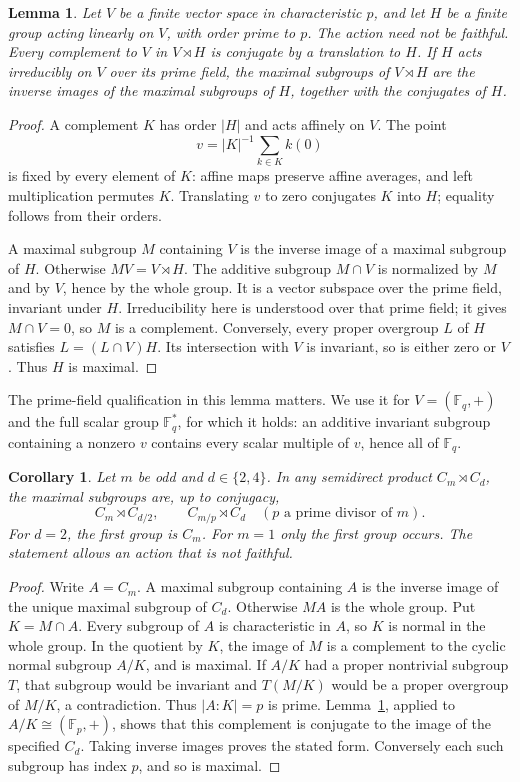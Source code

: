 \documentclass[11pt,a4paper]{article}
\newtheorem{lemma}[theorem]{Lemma}
\newtheorem{corollary}[theorem]{Corollary}
\newcommand{\F}{\mathbb F}
\begin{document}
\begin{lemma}\label{affine}
Let $V$ be a finite vector space in characteristic $p$, and let
$H$ be a finite group acting linearly on $V$, with order prime to $p$.
The action need not be faithful. Every complement
to $V$ in $V\rtimes H$ is conjugate by a translation to $H$.
If $H$ acts irreducibly on $V$ over its prime field, the maximal subgroups of $V\rtimes H$
are the inverse images of the maximal subgroups of $H$, together
with the conjugates of $H$.
\end{lemma}
\begin{proof}
A complement $K$ has order $|H|$ and acts affinely on $V$. The point
\[
                 v=|K|^{-1}\sum_{k\in K}k(0)
\]
is fixed by every element of $K$: affine maps preserve affine
averages, and left multiplication permutes $K$. Translating $v$ to
zero conjugates $K$ into $H$; equality follows from their orders.

A maximal subgroup $M$ containing $V$ is the inverse image of a
maximal subgroup of $H$. Otherwise $MV=V\rtimes H$. The additive
subgroup $M\cap V$ is normalized by $M$ and by $V$, hence by the
whole group. It is a vector subspace over the prime field, invariant
under $H$. Irreducibility here is understood over that prime field;
it gives $M\cap V=0$, so $M$ is a complement. Conversely, every
proper overgroup $L$ of $H$ satisfies
$L=(L\cap V)H$. Its intersection with $V$ is invariant, so is either
zero or $V$. Thus $H$ is maximal.
\end{proof}

The prime-field qualification in this lemma matters. We use it for
$V=(\F_q,+)$ and the full scalar group $\F_q^*$, for which it holds:
an additive invariant subgroup containing a nonzero $v$ contains
every scalar multiple of $v$, hence all of $\F_q$.

\begin{corollary}\label{cyclic}
Let $m$ be odd and $d\in\{2,4\}$. In any semidirect product
$C_m\rtimes C_d$, the maximal subgroups are, up to conjugacy,
\[
 C_m\rtimes C_{d/2},\qquad
 C_{m/p}\rtimes C_d\quad(p\text{ a prime divisor of }m).
\]
For $d=2$, the first group is $C_m$. For $m=1$ only the first
group occurs. The statement allows an action that is not faithful.
\end{corollary}
\begin{proof}
Write $A=C_m$. A maximal subgroup containing $A$ is the inverse
image of the unique maximal subgroup of $C_d$. Otherwise $MA$ is
the whole group. Put $K=M\cap A$. Every subgroup of $A$ is
characteristic in $A$, so $K$ is normal in the whole group. In the
quotient by $K$, the image of $M$ is a complement to the cyclic
normal subgroup $A/K$, and is maximal. If $A/K$ had a proper
nontrivial subgroup $T$, that subgroup would be invariant and
$T(M/K)$ would be a proper overgroup of $M/K$, a contradiction.
Thus $|A:K|=p$ is prime. Lemma~\ref{affine}, applied to
$A/K\cong(\F_p,+)$, shows that this complement is conjugate to
the image of the specified $C_d$. Taking inverse images proves
the stated form. Conversely each such subgroup has index $p$,
and so is maximal.
\end{proof}
\end{document}
